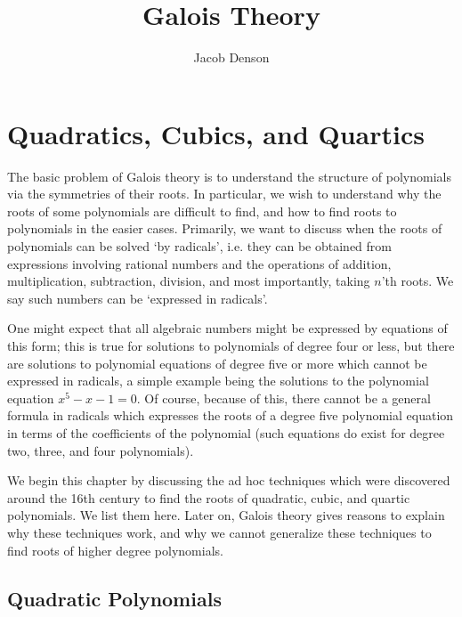 

\title{Galois Theory}
\author{Jacob Denson}



\maketitle
\tableofcontents

\chapter{Quadratics, Cubics, and Quartics}


The basic problem of Galois theory is to understand the structure of polynomials via the symmetries of their roots. In particular, we wish to understand why the roots of some polynomials are difficult to find, and how to find roots to polynomials in the easier cases. Primarily, we want to discuss when the roots of polynomials can be solved `by radicals', i.e. they can be obtained from expressions involving rational numbers and the operations of addition, multiplication, subtraction, division, and most importantly, taking $n$'th roots. We say such numbers can be `expressed in radicals'.

One might expect that all algebraic numbers might be expressed by equations of this form; this is true for solutions to polynomials of degree four or less, but there are solutions to polynomial equations of degree five or more which cannot be expressed in radicals, a simple example being the solutions to the polynomial equation $x^5 - x - 1 = 0$. Of course, because of this, there cannot be a general formula in radicals which expresses the roots of a degree five polynomial equation in terms of the coefficients of the polynomial (such equations do exist for degree two, three, and four polynomials).

We begin this chapter by discussing the ad hoc techniques which were discovered around the 16th century to find the roots of quadratic, cubic, and quartic polynomials. We list them here. Later on, Galois theory gives reasons to explain why these techniques work, and why we cannot generalize these techniques to find roots of higher degree polynomials.

\section{Quadratic Polynomials}

